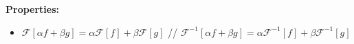 {\bf Properties:} 
\begin{itemize}
\item $\mathcal{F}[\alpha f+\beta g]=\alpha \mathcal{F}[f]+\beta \mathcal{F}[g]$ // $\mathcal{F}^{-1}[\alpha f+\beta g]=\alpha \mathcal{F}^{-1}[f]+\beta \mathcal{F}^{-1}[g]$
\end{itemize}